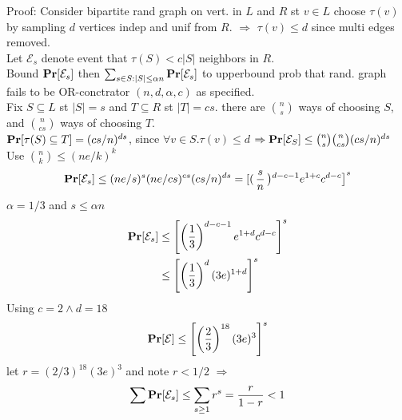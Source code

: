 \documentclass[a4paper]{article}
\def\Pr{\mbox{\textbf{Pr}}}
\begin{document}
Proof: Consider bipartite rand graph on vert. in \(L\) and \(R\) st \(v\in L\) choose \(\tau(v)\) by sampling \(d\) vertices indep and unif from \(R\). \(\Rightarrow\) \(\tau(v) \leq d\) since multi edges removed.\\
Let \(\mathcal{E}_s\) denote event that \(\tau(S) < c|S|\) neighbors in \(R\).\\
Bound \(\Pr[\mathcal{E}_s]\) then \(\sum_{s\in S: |S| \leq \alpha n} \Pr[\mathcal{E}_s]\) to upperbound prob that rand. graph fails to be OR-conctrator \((n,d,\alpha,c)\) as specified.\\
Fix \(S\subseteq L\) st \(|S|=s\) and \(T\subseteq R\) st \(|T|=cs\). there are \({n \choose s}\) ways of choosing \(S\), and \({n \choose cs}\) ways of choosing \(T\).\\
\(\Pr[\tau(S) \subseteq T] = (cs/n)^{ds}\), since \(\forall v\in S.\tau(v) \leq d\) \(\Rightarrow \Pr[\mathcal{E}_S] \leq {n \choose s} {n \choose cs} (cs/n)^{ds}\)\\
Use \({n \choose k} \leq (ne/k)^k\)
\[\Pr[\mathcal{E}_s]\leq (ne/s)^s(ne/cs)^{cs}(cs/n)^{ds}  = \left[\right(\frac{s}{n}\left)^{d-c-1} e^{1+c} c^{d-c}\right]^s\]
\(\alpha = 1/3\) and \(s \leq \alpha n\)\\
\begin{align*}
\Pr[\mathcal{E}_s] &\leq \left[\left(\frac{1}{3}\right)^{d-c-1} e^{1+d} c^{d-c}\right]^s\\
                   &\leq \left[\left(\frac{1}{3}\right)^{d} (3e)^{1+d}\right]^s
\end{align*}
Using \(c=2 \wedge d=18\)
\[\Pr[\mathcal{E}] \leq \left[\left(\frac{2}{3}\right)^{18}(3e)^3\right]^s\]
let \(r=(2/3)^{18}(3e)^3\) and note \(r < 1/2\) \(\Rightarrow\)
\[\sum \Pr[\mathcal{E}_s] \leq \sum_{s\geq 1} r^s = \frac{r}{1-r} < 1\]
\end{document}
